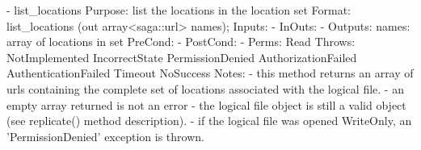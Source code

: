 \begin{myspec}
 
    - list_locations
      Purpose:  list the locations in the location set
      Format:   list_locations   (out array<saga::url> names);
      Inputs:   -
      InOuts:   -
      Outputs:  names:            array of locations in set
      PreCond:  -
      PostCond: - 
      Perms:    Read
      Throws:   NotImplemented
                IncorrectState
                PermissionDenied
                AuthorizationFailed
                AuthenticationFailed
                Timeout
                NoSuccess
      Notes:    - this method returns an array of urls
                  containing the complete set of locations
                  associated with the logical file.
                - an empty array returned is not an error - 
                  the logical file object is still a valid 
                  object (see replicate() method description).
                - if the logical file was opened WriteOnly, an
                  'PermissionDenied' exception is thrown.
 

\end{myspec}
